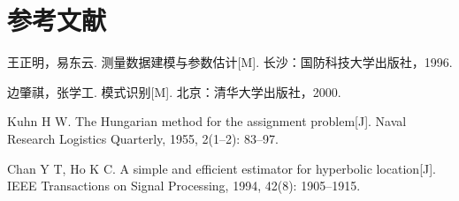 \documentclass[12pt,a4paper]{article}
\newcommand{\tip}[1]{\par\noindent\textbf{【提示】} #1\par}
\newcommand{\warning}[1]{\par\noindent\textbf{【高频失分点】} #1\par}
\begin{document}



\section{参考文献}


\begin{enumerate}[label={[\arabic*]}]
  \item 王正明，易东云. 测量数据建模与参数估计[M]. 长沙：国防科技大学出版社，1996.
  \item 边肇祺，张学工. 模式识别[M]. 北京：清华大学出版社，2000.
  \item Kuhn H W. The Hungarian method for the assignment problem[J]. Naval Research Logistics Quarterly, 1955, 2(1--2): 83--97.
  \item Chan Y T, Ho K C. A simple and efficient estimator for hyperbolic location[J]. IEEE Transactions on Signal Processing, 1994, 42(8): 1905--1915.
\end{enumerate}
\end{document}

